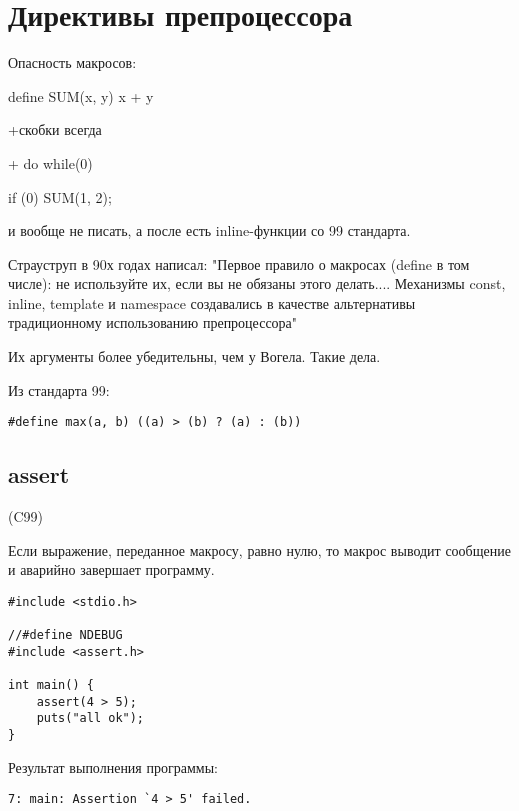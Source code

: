 \documentclass[myc.tex]{subfiles}
\begin{document}
\chapter{Директивы препроцессора}
\label{ch:preprocessor}

Опасность макросов:


define SUM(x, y) x + y


+скобки всегда

+ do {} while(0)


if (0) SUM(1, 2);


и вообще не писать, а после есть inline-функции со 99 стандарта.



Страуструп в 90х годах написал: 
"Первое правило о макросах (define в том числе): не используйте их, если вы не обязаны этого делать.... Механизмы const, inline, template и namespace создавались в качестве альтернативы традиционному использованию препроцессора"


Их аргументы более убедительны, чем у Вогела. Такие дела.




Из стандарта 99:
\begin{lstlisting}
#define max(a, b) ((a) > (b) ? (a) : (b))
\end{lstlisting}







\section{assert}

(C99)

Если выражение, переданное макросу, равно нулю, то макрос выводит сообщение и аварийно завершает программу.


\begin{lstlisting}
#include <stdio.h>

//#define NDEBUG
#include <assert.h>

int main() {
    assert(4 > 5);
    puts("all ok");
}
\end{lstlisting}

Результат выполнения программы:
\begin{verbatim}
7: main: Assertion `4 > 5' failed.
\end{verbatim} 
\end{document}
